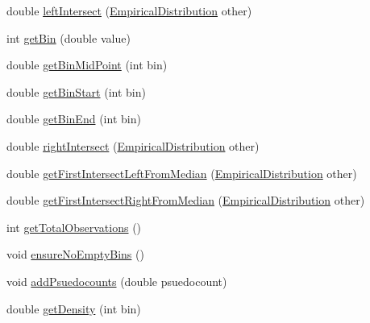 \begin{DoxyCompactItemize}
\item 
double \hyperlink{classbroad_1_1core_1_1math_1_1_empirical_distribution_a75239f68d3a0a0a898b45aa4660ef49c}{left\+Intersect} (\hyperlink{classbroad_1_1core_1_1math_1_1_empirical_distribution}{Empirical\+Distribution} other)
\item 
int \hyperlink{classbroad_1_1core_1_1math_1_1_empirical_distribution_a12f62582e15df016e650156de658c99a}{get\+Bin} (double value)
\item 
double \hyperlink{classbroad_1_1core_1_1math_1_1_empirical_distribution_a57aa10b8a192dac9d2a4ac4e90547c61}{get\+Bin\+Mid\+Point} (int bin)
\item 
double \hyperlink{classbroad_1_1core_1_1math_1_1_empirical_distribution_aa50df0c29126b3eeea6773ac1c8e5572}{get\+Bin\+Start} (int bin)
\item 
double \hyperlink{classbroad_1_1core_1_1math_1_1_empirical_distribution_a5bb9a84df2962122db60c0ddb1bd1784}{get\+Bin\+End} (int bin)
\item 
double \hyperlink{classbroad_1_1core_1_1math_1_1_empirical_distribution_a419b58834015fd7dc510a92261fbf7ef}{right\+Intersect} (\hyperlink{classbroad_1_1core_1_1math_1_1_empirical_distribution}{Empirical\+Distribution} other)
\item 
double \hyperlink{classbroad_1_1core_1_1math_1_1_empirical_distribution_a3f2ef6d9169a542a9efa85d33b56f6d2}{get\+First\+Intersect\+Left\+From\+Median} (\hyperlink{classbroad_1_1core_1_1math_1_1_empirical_distribution}{Empirical\+Distribution} other)
\item 
double \hyperlink{classbroad_1_1core_1_1math_1_1_empirical_distribution_ac8c6bfb7c1e20464cbf057b49a14d854}{get\+First\+Intersect\+Right\+From\+Median} (\hyperlink{classbroad_1_1core_1_1math_1_1_empirical_distribution}{Empirical\+Distribution} other)
\item 
int \hyperlink{classbroad_1_1core_1_1math_1_1_empirical_distribution_afce47669b093234f08a4d04a527cc488}{get\+Total\+Observations} ()
\item 
void \hyperlink{classbroad_1_1core_1_1math_1_1_empirical_distribution_a40884a72892c67164e4c55b3ccb00bec}{ensure\+No\+Empty\+Bins} ()
\item 
void \hyperlink{classbroad_1_1core_1_1math_1_1_empirical_distribution_a91a33deccf567c1be08a483115f9d643}{add\+Psuedocounts} (double psuedocount)
\item 
double \hyperlink{classbroad_1_1core_1_1math_1_1_empirical_distribution_af964172d81916b8a1ee2dbb6c2a2ff73}{get\+Density} (int bin)
\item 

\end{DoxyCompactItemize}

